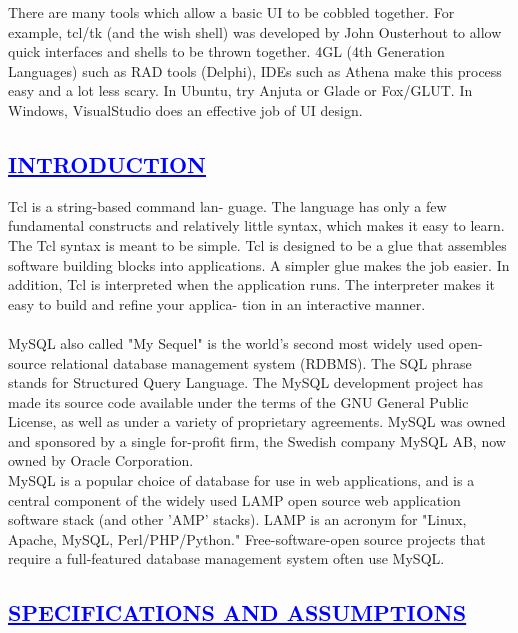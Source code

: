 \documentclass[a4paper,12pt]{report}
\begin{document}
There are many tools which allow a basic UI to be cobbled together. For example, tcl/tk (and the wish shell) was developed by John Ousterhout to allow quick interfaces and shells to be thrown together. 4GL (4th Generation Languages) such as RAD tools (Delphi), IDEs such as Athena make this process easy and a lot less scary. In Ubuntu, try Anjuta or Glade or Fox/GLUT. In Windows, VisualStudio does an effective job of UI design.
\begin{center}
\chapter{\textcolor{blue}{\underline {INTRODUCTION}}}
\end{center}
\noindent Tcl is a string-based command lan- guage. The language has only a few fundamental constructs and relatively little
syntax, which makes it easy to learn. The Tcl syntax is meant to be simple. Tcl is designed to be a glue that assembles software building blocks into applications.
A simpler glue makes the job easier. In addition, Tcl is interpreted when the application runs. The interpreter makes it easy to build and refine your applica-
tion in an interactive manner.\\\\
MySQL  also called "My Sequel" is the world's second most widely used open-source relational database management system (RDBMS). The SQL phrase stands for Structured Query Language.
The MySQL development project has made its source code available under the terms of the GNU General Public License, as well as under a variety of proprietary agreements. MySQL was owned and sponsored by a single for-profit firm, the Swedish company MySQL AB, now owned by Oracle Corporation.\\

MySQL is a popular choice of database for use in web applications, and is a central component of the widely used LAMP open source web application software stack (and other 'AMP' stacks). LAMP is an acronym for "Linux, Apache, MySQL, Perl/PHP/Python." Free-software-open source projects that require a full-featured database management system often use MySQL.

\begin{center}
\chapter{\textcolor{blue}{\underline {SPECIFICATIONS AND ASSUMPTIONS}}}
\end{center}
\end{document}
